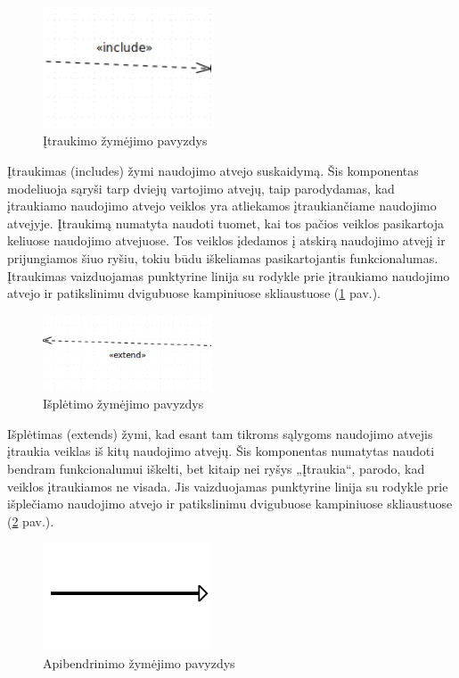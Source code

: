 \begin{figure}[H]
	\centering
	\includegraphics[width=5cm]{img/use_case_components/includes}
	\caption{Įtraukimo žymėjimo pavyzdys}
	\label{img:use_case_components_includes}
\end{figure}

Įtraukimas (includes) žymi naudojimo atvejo suskaidymą. Šis komponentas modeliuoja sąryši tarp dviejų vartojimo atvejų, taip parodydamas, kad įtraukiamo naudojimo atvejo veiklos yra atliekamos įtraukiančiame naudojimo atvejyje. Įtraukimą numatyta naudoti tuomet, kai tos pačios veiklos pasikartoja keliuose naudojimo atvejuose. Tos veiklos įdedamos į atskirą naudojimo atvejį ir prijungiamos šiuo ryšiu, tokiu būdu iškeliamas pasikartojantis funkcionalumas. Įtraukimas vaizduojamas punktyrine linija su rodykle  prie įtraukiamo naudojimo atvejo ir patikslinimu dvigubuose kampiniuose skliaustuose (\ref{img:use_case_components_includes} pav.).

\begin{figure}[H]
	\centering
	\includegraphics[width=5cm]{img/use_case_components/extend}
	\caption{Išplėtimo žymėjimo pavyzdys}
	\label{img:use_case_components_extends}
\end{figure}

Išplėtimas (extends) žymi, kad esant tam tikroms sąlygoms naudojimo atvejis įtraukia veiklas iš kitų naudojimo atvejų. Šis komponentas numatytas naudoti bendram funkcionalumui iškelti, bet kitaip nei ryšys „Įtraukia“, parodo, kad veiklos įtraukiamos ne visada. Jis vaizduojamas punktyrine linija su rodykle prie išplečiamo naudojimo atvejo ir patikslinimu dvigubuose kampiniuose skliaustuose (\ref{img:use_case_components_extends} pav.).

\begin{figure}[H]
	\centering
	\includegraphics[width=5cm]{img/use_case_components/generalization}
	\caption{Apibendrinimo žymėjimo pavyzdys}
	\label{img:use_case_components_generalization}
\end{figure}

